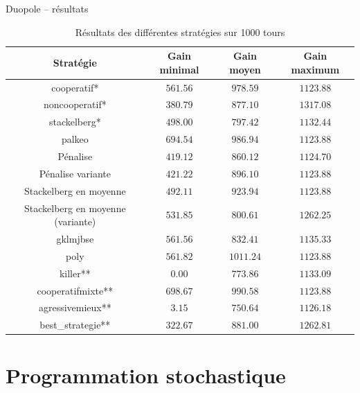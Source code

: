 \documentclass{beamer}
\begin{document}
\begin{frame}{Duopole -- résultats}
  \tiny{%
    \begin{table}[f]
      \centering
      \begin{tabular}{|c||c|c|c|}
        \hline
        Stratégie      & Gain minimal & Gain moyen & Gain maximum \\\hline\hline
         cooperatif* & $561.56$ & $978.59$ & $1123.88$ \\\hline
      noncooperatif* & $380.79$ & $877.10$ & $1317.08$ \\\hline
        stackelberg* & $498.00$ & $797.42$ & $1132.44$ \\\hline
              palkeo & $694.54$ & $986.94$ & $1123.88$ \\\hline
            Pénalise & $419.12$ & $860.12$ & $1124.70$ \\\hline
   Pénalise variante & $421.22$ & $896.10$ & $1123.88$ \\\hline
Stackelberg en moyenne & $492.11$ & $923.94$ & $1123.88$ \\\hline
Stackelberg en moyenne (variante) & $531.85$ & $800.61$ & $1262.25$ \\\hline
            gklmjbse & $561.56$ & $832.41$ & $1135.33$ \\\hline
                poly & $561.82$ & $1011.24$ & $1123.88$ \\\hline
            killer** & $  0.00$ & $773.86$ & $1133.09$ \\\hline
   cooperatifmixte** & $698.67$ & $990.58$ & $1123.88$ \\\hline
    agressivemieux** & $  3.15$ & $750.64$ & $1126.18$ \\\hline
   best\_strategie** & $322.67$ & $881.00$ & $1262.81$ \\\hline
      \end{tabular}
      \caption{Résultats des différentes stratégies sur 1000 tours}
      \label{table:coop_results2}
    \end{table}
  }
\end{frame}

\section{Programmation stochastique}
\end{document}

